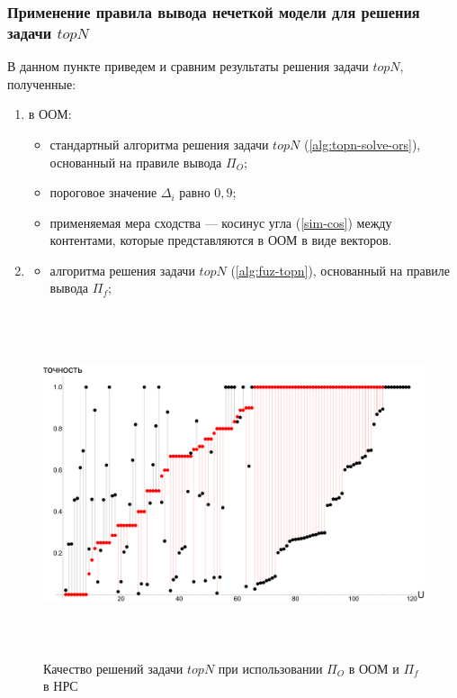 \subsubsection{Применение правила вывода нечеткой модели для решения задачи
$topN$}
В данном пункте приведем и сравним результаты решения задачи $topN$, полученные:
\begin{enumerate}
	\item в ООМ:
		\begin{itemize}
			\item
			стандартный алгоритма решения задачи
			$topN$ (\ref{alg:topn-solve-ors}), основанный на
			правиле вывода $\Pi_O$;
			\item
			пороговое значение $\Delta_i$ равно $0,9$;
			\item
		применяемая мера сходства --- косинус угла (\ref{sim-cos})
		между контентами, которые представляются в ООМ в виде векторов.
		\end{itemize}
	\item
		\begin{itemize}
			\item
			алгоритма решения задачи
			$topN$ (\ref{alg:fuz-topn}), основанный на
			правиле вывода $\Pi_f$;
		\end{itemize}
\end{enumerate}


\begin{figure}[H]
	\caption{Качество решений задачи $topN$ при использовании $\Pi_O$ в ООМ и
	$\Pi_f$ в НРС}
	\label{pic:topn_pio_pif}
	\begin{center}
		\includegraphics[width=7in,height=4in]{pics/results/topn_oom_fuzz.pdf}
\end{center}
\end{figure}

